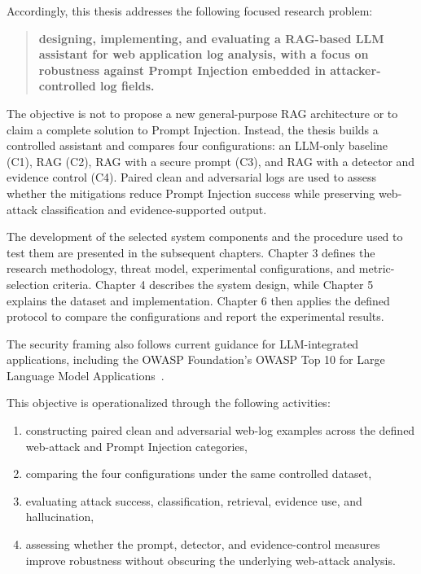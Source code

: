 Accordingly, this thesis addresses the following focused research problem:

\begin{quote}
\textbf{designing, implementing, and evaluating a RAG-based LLM assistant
for web application log analysis, with a focus on robustness against
Prompt Injection embedded in attacker-controlled log fields.}
\end{quote}

The objective is not to propose a new general-purpose RAG architecture or
to claim a complete solution to Prompt Injection. Instead, the thesis
builds a controlled assistant and compares four configurations: an LLM-only
baseline (C1), RAG (C2), RAG with a secure prompt (C3), and RAG with a
detector and evidence control (C4). Paired clean and adversarial logs are
used to assess whether the mitigations reduce Prompt Injection success
while preserving web-attack classification and evidence-supported output.

The development of the selected system components and the procedure used
to test them are presented in the subsequent chapters. Chapter 3 defines
the research methodology, threat model, experimental configurations, and
metric-selection criteria. Chapter 4 describes the system design, while
Chapter 5 explains the dataset and implementation. Chapter 6 then applies
the defined protocol to compare the configurations and report the
experimental results.

The security framing also follows current guidance for LLM-integrated
applications, including the OWASP Foundation's OWASP Top 10 for Large
Language Model Applications~\cite{owasp2025llmtop10}.

This objective is operationalized through the following activities:

\begin{enumerate}
\def\labelenumi{\arabic{enumi}.}
\tightlist
\item
  constructing paired clean and adversarial web-log examples across the
  defined web-attack and Prompt Injection categories,
\item
  comparing the four configurations under the same controlled dataset,
\item
  evaluating attack success, classification, retrieval, evidence use, and
  hallucination,
\item
  assessing whether the prompt, detector, and evidence-control measures
  improve robustness without obscuring the underlying web-attack analysis.
\end{enumerate}
